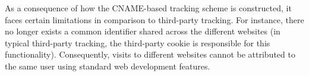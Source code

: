 As a consequence of how the CNAME-based tracking scheme is constructed, it faces certain limitations in comparison to third-party tracking.
For instance, there no longer exists a common identifier shared across the different websites (in typical third-party tracking, the third-party cookie is responsible for this functionality).
Consequently, visits to different websites cannot be attributed to the same user using standard web development features.



